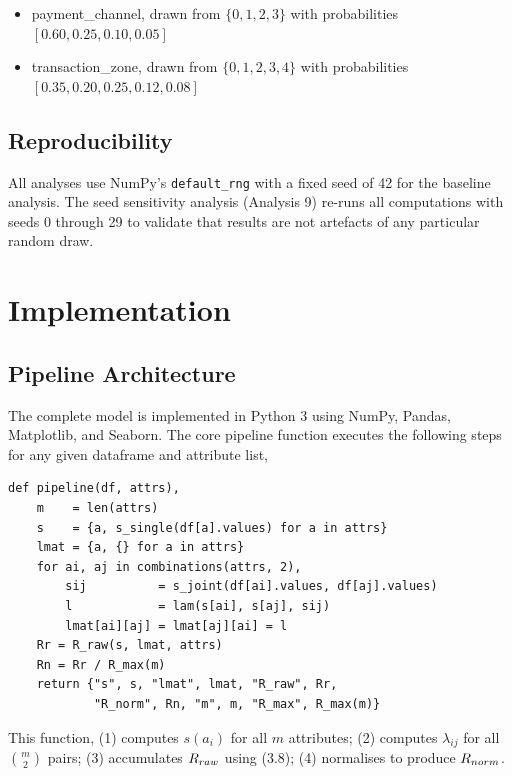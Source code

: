 \begin{itemize}
    \item payment\_channel, drawn from
    $\{0,1,2,3\}$ with probabilities
    $[0.60, 0.25, 0.10, 0.05]$
    \item transaction\_zone, drawn from
    $\{0,1,2,3,4\}$ with probabilities
    $[0.35, 0.20, 0.25, 0.12, 0.08]$
\end{itemize}

\subsection{Reproducibility}

All analyses use NumPy's \texttt{default\_rng} with a fixed
seed of 42 for the baseline analysis. The seed sensitivity
analysis (Analysis 9) re-runs all computations with seeds
0 through 29 to validate that results are not artefacts of
any particular random draw.

\section{Implementation}
\label{sec:implementation}

\subsection{Pipeline Architecture}

The complete model is implemented in Python 3 using NumPy,
Pandas, Matplotlib, and Seaborn. The core pipeline function
executes the following steps for any given dataframe and
attribute list,

\begin{lstlisting}
def pipeline(df, attrs),
    m    = len(attrs)
    s    = {a, s_single(df[a].values) for a in attrs}
    lmat = {a, {} for a in attrs}
    for ai, aj in combinations(attrs, 2),
        sij          = s_joint(df[ai].values, df[aj].values)
        l            = lam(s[ai], s[aj], sij)
        lmat[ai][aj] = lmat[aj][ai] = l
    Rr = R_raw(s, lmat, attrs)
    Rn = Rr / R_max(m)
    return {"s", s, "lmat", lmat, "R_raw", Rr,
            "R_norm", Rn, "m", m, "R_max", R_max(m)}
\end{lstlisting}

This function, (1) computes $s(a_i)$ for all $m$ attributes;
(2) computes $\lambda_{ij}$ for all $\binom{m}{2}$ pairs;
(3) accumulates $R_{raw}$ using (3.8);
(4) normalises to produce $R_{norm}$.

